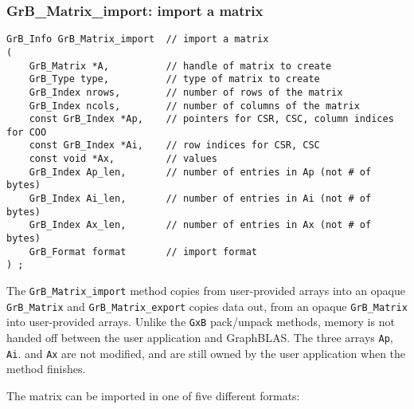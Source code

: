 \documentclass[12pt]{article}
\begin{document}
\newpage
\subsubsection{{\sf GrB\_Matrix\_import:}  import a matrix}
\label{GrB_matrix_import}

\begin{mdframed}[userdefinedwidth=6in]
{\footnotesize
\begin{verbatim}
GrB_Info GrB_Matrix_import  // import a matrix
(
    GrB_Matrix *A,          // handle of matrix to create
    GrB_Type type,          // type of matrix to create
    GrB_Index nrows,        // number of rows of the matrix
    GrB_Index ncols,        // number of columns of the matrix
    const GrB_Index *Ap,    // pointers for CSR, CSC, column indices for COO
    const GrB_Index *Ai,    // row indices for CSR, CSC
    const void *Ax,         // values
    GrB_Index Ap_len,       // number of entries in Ap (not # of bytes)
    GrB_Index Ai_len,       // number of entries in Ai (not # of bytes)
    GrB_Index Ax_len,       // number of entries in Ax (not # of bytes)
    GrB_Format format       // import format
) ;
\end{verbatim}
} \end{mdframed}

The \verb'GrB_Matrix_import' method copies from user-provided arrays into an
opaque \verb'GrB_Matrix' and \verb'GrB_Matrix_export' copies data out, from an
opaque \verb'GrB_Matrix' into user-provided arrays.  Unlike the \verb'GxB'
pack/unpack methods, memory is not handed off between the user application
and GraphBLAS.   The three arrays \verb'Ap', \verb'Ai'.  and \verb'Ax' are not
modified, and are still owned by the user application when the method finishes.

The matrix can be imported in one of five different formats:
\end{document}
